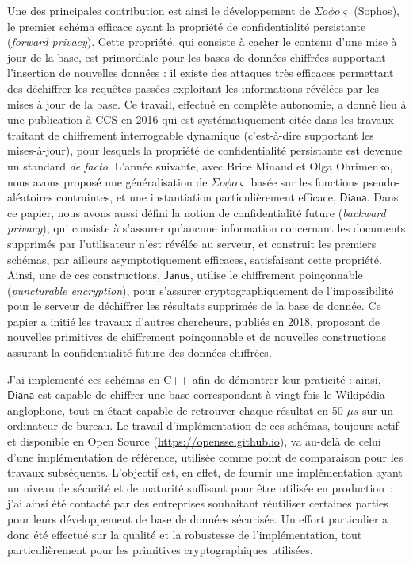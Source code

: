 \documentclass[a4]{article}
\newcommand{\sophos}{{\Sigma o\phi o\varsigma}}
\newcommand{\diana}{\ensuremath{\mathsf{Diana}}}
\newcommand{\janus}{\ensuremath{\mathsf{Janus}}}
\begin{document}
Une des principales contribution est ainsi le développement de $\sophos$ (Sophos), le premier schéma efficace ayant la propriété de confidentialité persistante (\emph{forward privacy}).
Cette propriété, qui consiste à cacher le contenu d'une mise à jour de la base, est primordiale pour les bases de données chiffrées supportant l'insertion de nouvelles données : il existe des attaques très efficaces permettant des déchiffrer les requêtes passées exploitant les informations révélées par les mises à jour de la base.
Ce travail, effectué en complète autonomie, a donné lieu à une publication à CCS en 2016 qui est systématiquement citée dans les travaux traitant de chiffrement interrogeable dynamique (c'est-à-dire supportant les mises-à-jour), pour lesquels la propriété de confidentialité persistante est devenue un standard \emph{de facto}.
L'année suivante, avec Brice Minaud et Olga Ohrimenko, nous avons proposé une généralisation de $\sophos$ basée sur les fonctions pseudo-aléatoires contraintes, et une instantiation particulièrement efficace, $\diana$.
Dans ce papier, nous avons aussi défini la notion de confidentialité future (\emph{backward privacy}), qui consiste à s'assurer qu'aucune information concernant les documents supprimés par l'utilisateur n'est révélée au serveur, et construit les premiers schémas, par ailleurs asymptotiquement efficaces, satisfaisant cette propriété.
Ainsi, une de ces constructions, $\janus$, utilise 
le chiffrement poinçonnable (\emph{puncturable encryption}), pour s'assurer cryptographiquement de l'impossibilité pour le serveur de déchiffrer les résultats supprimés de la base de donnée.
Ce papier a initié les travaux d'autres chercheurs, publiés en 2018, proposant de nouvelles primitives de chiffrement poinçonnable et de nouvelles constructions assurant la confidentialité future des données chiffrées.


J'ai implementé ces schémas en C++ afin de démontrer leur praticité : ainsi, $\diana$ est capable de chiffrer une base correspondant à vingt fois le Wikipédia anglophone, tout en étant capable de retrouver chaque résultat en 50 $\mu s$ sur un ordinateur de bureau.
Le travail d'implémentation de ces schémas, toujours actif et disponible en Open Source (\url{https://opensse.github.io}), va au-delà de celui d'une implémentation de référence, utilisée comme point de comparaison pour les travaux subséquents.
L'objectif est, en effet, de fournir une implémentation ayant un niveau de sécurité et de maturité suffisant pour être utilisée en production~: j'ai ainsi été contacté par des entreprises souhaitant réutiliser certaines parties pour leurs développement de base de données sécurisée.
Un effort particulier a donc été effectué sur la qualité et la robustesse de l'implémentation, tout particulièrement pour les primitives cryptographiques utilisées.
\end{document}
